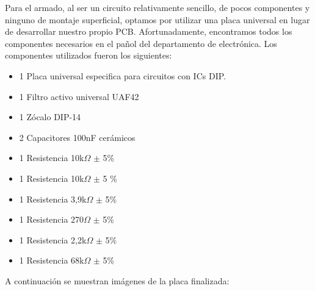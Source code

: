 \documentclass[11pt,a4paper]{report}
\begin{document}
Para el armado, al ser un circuito relativamente sencillo, de pocos componentes y ninguno de montaje superficial, optamos por utilizar una placa universal en lugar de desarrollar nuestro propio PCB. Afortunadamente, encontramos todos los componentes necesarios en el pañol del departamento de electrónica.
Los componentes utilizados fueron los siguientes:

\begin{itemize}
    \singlespacing
    \item 1  Placa universal especifica para circuitos con ICs DIP.
    \item 1  Filtro activo universal UAF42
    \item 1  Zócalo DIP-14
    \item 2  Capacitores 100nF cerámicos
    \item 1  Resistencia 10k$\Omega$ $\pm$ 5\%
    \item 1  Resistencia 10k$\Omega$ $\pm$ 5 \%
    \item 1  Resistencia 3,9k$\Omega$ $\pm$ 5\%
    \item 1  Resistencia 270$\Omega$ $\pm$ 5\%
    \item 1  Resistencia 2,2k$\Omega$ $\pm$ 5\%
    \item 1  Resistencia 68k$\Omega$ $\pm$ 5\%
\end{itemize}

A continuación se muestran imágenes de la placa finalizada:
\end{document}
